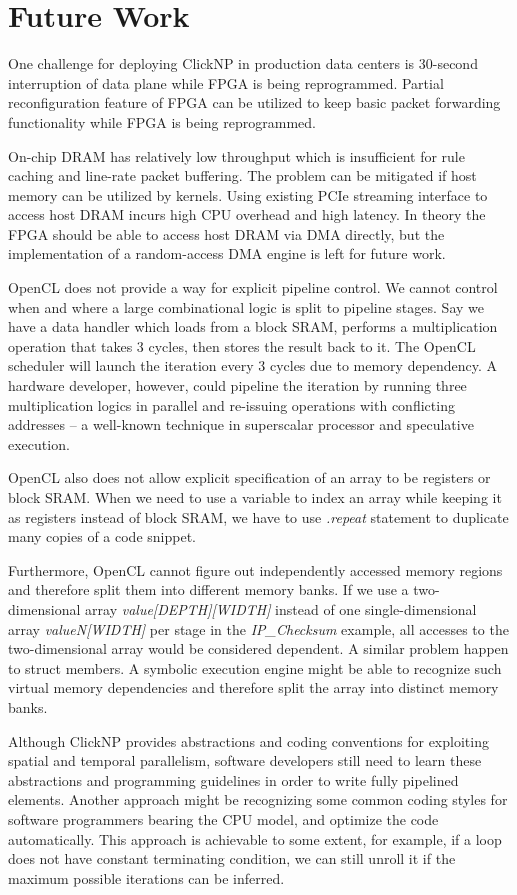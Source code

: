 \section{Future Work}
\label{clicknp:sec:future}

One challenge for deploying ClickNP in production data centers is 30-second interruption of data plane while FPGA is being reprogrammed. Partial reconfiguration \cite{bourgeault2011alteras} feature of FPGA can be utilized to keep basic packet forwarding functionality while FPGA is being reprogrammed.

On-chip DRAM has relatively low throughput which is insufficient for rule caching and line-rate packet buffering. The problem can be mitigated if host memory can be utilized by kernels. Using existing PCIe streaming interface to access host DRAM incurs high CPU overhead and high latency. In theory the FPGA should be able to access host DRAM via DMA directly, but the implementation of a random-access DMA engine is left for future work.

OpenCL does not provide a way for explicit pipeline control. We cannot control when and where a large combinational logic is split to pipeline stages. Say we have a data handler which loads from a block SRAM, performs a multiplication operation that takes 3 cycles, then stores the result back to it. The OpenCL scheduler will launch the iteration every 3 cycles due to memory dependency. A hardware developer, however, could pipeline the iteration by running three multiplication logics in parallel and re-issuing operations with conflicting addresses -- a well-known technique in superscalar processor and speculative execution.

OpenCL also does not allow explicit specification of an array to be registers or block SRAM. When we need to use a variable to index an array while keeping it as registers instead of block SRAM, we have to use \textit{.repeat} statement to duplicate many copies of a code snippet.

Furthermore, OpenCL cannot figure out independently accessed memory regions and therefore split them into different memory banks. If we use a two-dimensional array \textit{value[DEPTH][WIDTH]} instead of one single-dimensional array \textit{valueN[WIDTH]} per stage in the \textit{IP\_Checksum} example, all accesses to the two-dimensional array would be considered dependent. A similar problem happen to struct members. A symbolic execution engine might be able to recognize such virtual memory dependencies and therefore split the array into distinct memory banks.

Although ClickNP provides abstractions and coding conventions for exploiting spatial and temporal parallelism, software developers still need to learn these abstractions and programming guidelines in order to write fully pipelined elements. Another approach might be recognizing some common coding styles for software programmers bearing the CPU model, and optimize the code automatically. This approach is achievable to some extent, for example, if a loop does not have constant terminating condition, we can still unroll it if the maximum possible iterations can be inferred.
